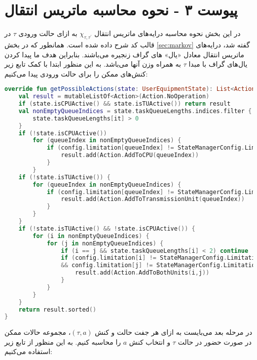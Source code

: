 \chapter*{پیوست ۳ - نحوه محاسبه ماتریس انتقال}
\label{appendix:3}
در این بخش نحوه محاسبه درایه‌های ماتریس انتقال $\chi_{\tau, \tau^{\prime}}$ به ازای حالت ورودی $\tau$ در قالب کد شرح داده شده است. همانطور که در بخش \ref{sec:markov} گفته شد، درايه‌های ماتریس انتقال معادل «یال» های گراف زنجیره می‌باشند. بنابراین هدف ما پیدا کردن یال‌های گراف با مبدا $\tau$ به همراه وزن آنها می‌باشد. به این منظور ابتدا با کمک تابع زیر کنش‌های ممکن را برای حالت ورودی پیدا می‌کنیم:
\begin{latin}
	\begin{lstlisting}[language=Kotlin, title=\rl{تابع محاسبه کنش‌های ممکن به ازای حالت داده شده}]
override fun getPossibleActions(state: UserEquipmentState): List<Action> {
	val result = mutableListOf<Action>(Action.NoOperation)
	if (state.isCPUActive() && state.isTUActive()) return result
	val nonEmptyQueueIndices = state.taskQueueLengths.indices.filter { 
		state.taskQueueLengths[it] > 0 
	}
	if (!state.isCPUActive())
		for (queueIndex in nonEmptyQueueIndices) {
			if (config.limitation[queueIndex] != StateManagerConfig.Limitation.OffloadOnly) {
				result.add(Action.AddToCPU(queueIndex))
			}
		}
	if (!state.isTUActive()) {
		for (queueIndex in nonEmptyQueueIndices) {
			if (config.limitation[queueIndex] != StateManagerConfig.Limitation.LocalOnly) {
				result.add(Action.AddToTransmissionUnit(queueIndex))
			}
		}
	}
	if (!state.isTUActive() && !state.isCPUActive()) {
		for (i in nonEmptyQueueIndices) {
			for (j in nonEmptyQueueIndices) {
				if (i == j && state.taskQueueLengths[i] < 2) continue
				if (config.limitation[i] != StateManagerConfig.Limitation.OffloadOnly 
				&& config.limitation[j] != StateManagerConfig.Limitation.LocalOnly) {
					result.add(Action.AddToBothUnits(i,j))
				}
			}
		}
	}
	return result.sorted()
}
	\end{lstlisting}
\end{latin}
\newpage
در مرحله بعد می‌بایست به ازای هر جفت حالت و کنش $(\tau, a)$، مجموعه حالات ممکن در صورت حضور در حالت $\tau$ و انتخاب کنش $a$ را محاسبه کنیم. به این منظور از تابع زیر استفاده می‌کنیم:
